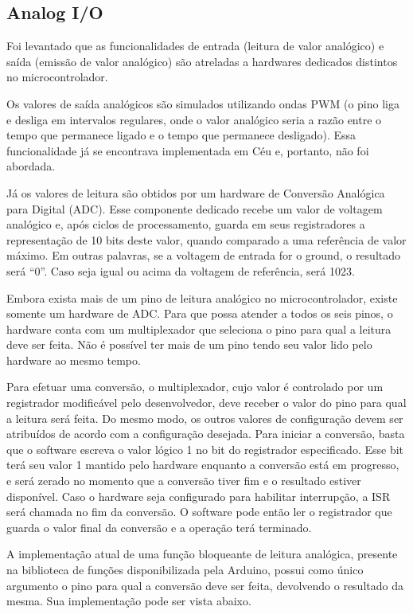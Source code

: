 \documentclass[11pt]{article}
\begin{document}
\subsection{Analog I/O}
\tab Foi levantado que as funcionalidades de entrada (leitura de valor analógico) e saída (emissão de valor analógico) são atreladas a hardwares dedicados distintos no microcontrolador. 
\par Os valores de saída analógicos são simulados utilizando ondas PWM (o pino liga e desliga em intervalos regulares, onde o valor analógico seria a razão entre o tempo que permanece ligado e o tempo que permanece desligado). Essa funcionalidade já se encontrava implementada em Céu e, portanto, não foi abordada.
\par Já os valores de leitura são obtidos por um hardware de Conversão Analógica para Digital (ADC). Esse componente dedicado recebe um valor de voltagem analógico e, após ciclos de processamento, guarda em seus registradores a representação de 10 bits deste valor, quando comparado a uma referência de valor máximo. Em outras palavras, se a voltagem de entrada for o ground, o resultado será “0”. Caso seja igual ou acima da voltagem de referência, será 1023. 
\par Embora exista mais de um pino de leitura analógico no microcontrolador, existe somente um hardware de ADC. Para que possa atender a todos os seis pinos, o hardware conta com um multiplexador que seleciona o pino para qual a leitura deve ser feita. Não é possível ter mais de um pino tendo seu valor lido pelo hardware ao mesmo tempo. 
\par Para efetuar uma conversão, o multiplexador, cujo valor é controlado por um registrador modificável pelo desenvolvedor, deve receber o valor do pino para qual a leitura será feita. Do mesmo modo, os outros valores de configuração devem ser atribuídos de acordo com a configuração desejada. Para iniciar a conversão, basta que o software escreva o valor lógico 1 no bit do registrador especificado. Esse bit terá seu valor 1 mantido pelo hardware enquanto a conversão está em progresso, e será zerado no momento que a conversão tiver fim e o resultado estiver disponível. Caso o hardware seja configurado para habilitar interrupção, a ISR será chamada no fim da conversão. O software pode então ler o registrador que guarda o valor final da conversão e a operação terá terminado.
\par A implementação atual de uma função bloqueante de leitura analógica, presente na biblioteca de funções disponibilizada pela Arduino, possui como único argumento o pino para qual a conversão deve ser feita, devolvendo o resultado da mesma. Sua implementação pode ser vista abaixo.
\end{document}
